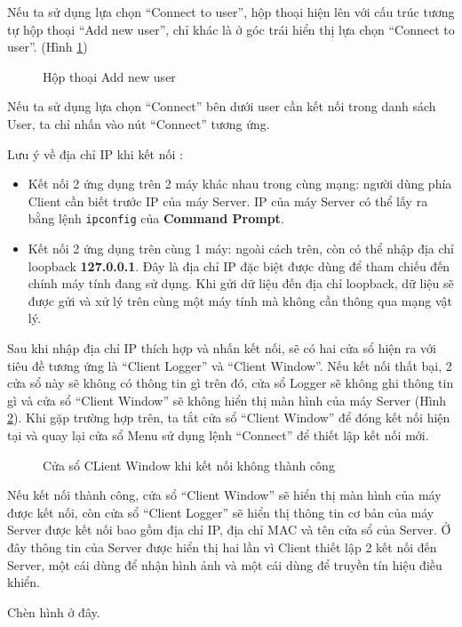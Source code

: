 Nếu ta sử dụng lựa chọn ``Connect to user'', hộp thoại hiện lên với cấu trúc tương tự hộp thoại ``Add new user'', chỉ khác là ở góc trái hiển thị lựa chọn ``Connect to user''. (Hình \ref{fig:ConnectToUserBox})

\begin{figure}[H]
	\caption{Hộp thoại Add new user}
	\label{fig:ConnectToUserBox}
\end{figure}

Nếu ta sử dụng lựa chọn ``Connect'' bên dưới user cần kết nối trong danh sách User, ta chỉ nhấn vào nút ``Connect'' tương ứng.

Lưu ý về địa chỉ IP khi kết nối :
\begin{itemize}
	\item  Kết nối 2 ứng dụng trên 2 máy khác nhau trong cùng mạng: người dùng phía Client cần biết trước IP của máy Server. IP của máy Server có thể lấy ra bằng lệnh \verb|ipconfig| của \textbf{Command Prompt}.
	\item Kết nối 2 ứng dụng trên cùng 1 máy: ngoài cách trên, còn có thể nhập địa chỉ loopback \textbf{127.0.0.1}. Đây là địa chỉ IP đặc biệt được dùng để tham chiếu đến chính máy tính đang sử dụng. Khi gửi dữ liệu đến địa chỉ loopback, dữ liệu sẽ được gửi và xử lý trên cùng một máy tính mà không cần thông qua mạng vật lý.
\end{itemize}

Sau khi nhập địa chỉ IP thích hợp và nhấn kết nối, sẽ có hai cửa sổ hiện ra với tiêu đề tương ứng là ``Client Logger'' và ``Client Window''. Nếu kết nối thất bại, 2 cửa sổ này sẽ không có thông tin gì trên đó, cửa sổ Logger sẽ không ghi thông tin gì và cửa sổ ``Client Window'' sẽ không hiển thị màn hình của máy Server (Hình \ref{fig:ClientWindowFailed}). Khi gặp trường hợp trên, ta tắt cửa sổ ``Client Window'' để đóng kết nối hiện tại và quay lại cửa sổ Menu sử dụng lệnh ``Connect'' để thiết lập kết nối mới.

\begin{figure}[H]
	\caption{Cửa sổ CLient Window khi kết nối không thành công}
	\label{fig:ClientWindowFailed}
\end{figure}

Nếu kết nối thành công, cửa sổ ``Client Window'' sẽ hiển thị màn hình của máy được kết nối, còn cửa sổ ``Client Logger'' sẽ hiển thị thông tin cơ bản của máy Server được kết nối bao gồm địa chỉ IP, địa chỉ MAC và tên cửa sổ của Server. Ở đây thông tin của Server được hiển thị hai lần vì Client thiết lập 2 kết nối đến Server, một cái dùng để nhận hình ảnh và một cái dùng để truyền tín hiệu điều khiển.

Chèn hình ở đây.